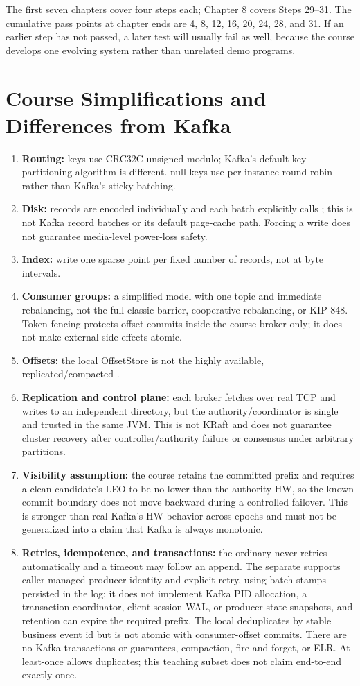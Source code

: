The first seven chapters cover four steps each; Chapter 8 covers Steps 29–31. The cumulative pass points at chapter ends are 4, 8, 12, 16, 20, 24, 28, and 31. If an earlier step has not passed, a later test will usually fail as well, because the course develops one evolving system rather than unrelated demo programs.

\section{Course Simplifications and Differences from Kafka}
\begin{enumerate}
\item \textbf{Routing:} keys use CRC32C unsigned modulo; Kafka's default key partitioning algorithm is different. null keys use per-instance round robin rather than Kafka's sticky batching.
\item \textbf{Disk:} records are encoded individually and each batch explicitly calls ; this is not Kafka record batches or its default page-cache path. Forcing a write does not guarantee media-level power-loss safety.
\item \textbf{Index:} write one sparse point per fixed number of records, not at byte intervals.
\item \textbf{Consumer groups:} a simplified model with one topic and immediate rebalancing, not the full classic barrier, cooperative rebalancing, or KIP-848. Token fencing protects offset commits inside the course broker only; it does not make external side effects atomic.
\item \textbf{Offsets:} the local OffsetStore is not the highly available, replicated/compacted .
\item \textbf{Replication and control plane:} each broker fetches over real TCP and writes to an independent directory, but the authority/coordinator is single and trusted in the same JVM. This is not KRaft and does not guarantee cluster recovery after controller/authority failure or consensus under arbitrary partitions.
\item \textbf{Visibility assumption:} the course retains the committed prefix and requires a clean candidate's LEO to be no lower than the authority HW, so the known commit boundary does not move backward during a controlled failover. This is stronger than real Kafka's HW behavior across epochs and must not be generalized into a claim that Kafka is always monotonic.
\item \textbf{Retries, idempotence, and transactions:} the ordinary  never retries automatically and a timeout may follow an append. The separate  supports caller-managed producer identity and explicit retry, using batch stamps persisted in the log; it does not implement Kafka PID allocation, a transaction coordinator, client session WAL, or producer-state snapshots, and retention can expire the required prefix. The local  deduplicates by stable business event id but is not atomic with consumer-offset commits. There are no Kafka transactions or  guarantees, compaction, fire-and-forget, or ELR. At-least-once allows duplicates; this teaching subset does not claim end-to-end exactly-once.

\end{enumerate}
